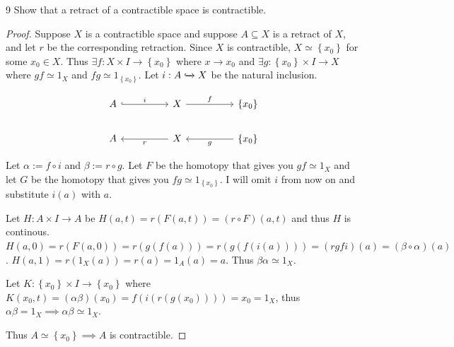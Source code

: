 \documentclass{article}
\begin{document}
\bigskip

\begin{claim}{9}\label{Claim 9.}
    Show that a retract of a contractible space is contractible.
\end{claim}
\begin{proof}
    Suppose $X$ is a contractible space and suppose $A \subseteq X$ is a retract of $X$, and let $r$ be the corresponding retraction. Since $X$ is contractible, $X \simeq \left\{ x_0 \right\}$ for some $x_0 \in X$. Thus $\exists f: X \times I  \to \left\{ x_0 \right\}$ where $x \to x_0$  and $\exists g: \left\{ x_0 \right\} \times I \to X$ where $g f \simeq 1_X$ and $f g \simeq 1_{\left\{ x_0 \right\}}$. Let $i: A \xhookrightarrow{} X$ be the natural inclusion.    
    
\[\begin{tikzcd}
	A && X && \left\{ x_0 \right\} \\
	A && X && \left\{ x_0 \right\}
	\arrow["i", hook, from=1-1, to=1-3]
	\arrow["f", from=1-3, to=1-5]
	\arrow["r", from=2-3, to=2-1]
	\arrow["g", from=2-5, to=2-3]
\end{tikzcd}\]

    Let $\alpha:= f \circ i$ and $\beta := r \circ g$. Let $F$ be the homotopy that gives you $gf \simeq 1_X$ and let $G$ be the homotopy that gives you $fg \simeq 1_{\left\{ x_0 \right\}}$. I will omit $i$ from now on and substitute $i(a)$ with $a$.    
    
    Let $H: A \times I \to A$ be $H(a, t) = r(F(a, t)) = (r \circ F)(a, t)$ and thus $H$ is continous. $H(a, 0) = r(F(a, 0)) = r(g(f(a))) = r(g(f(i(a)))) = (rgfi)(a) = (\beta \circ \alpha)(a)$. $H(a, 1) = r(1_X(a)) = r(a) = 1_A(a) = a$. Thus $\beta \alpha \simeq 1_X$. 
    
    Let $K: \left\{ x_0 \right\} \times I \to \left\{ x_0 \right\}$ where $K(x_0, t) = (\alpha \beta)(x_0) = f(i(r(g(x_0)))) = x_0 = 1_X$, thus $\alpha \beta = 1_X \implies \alpha \beta \simeq 1_X$. 
    
    Thus $A \simeq \left\{ x_0 \right\} \implies A$ is contractible.  
\end{proof}

\bigskip
\end{document}
